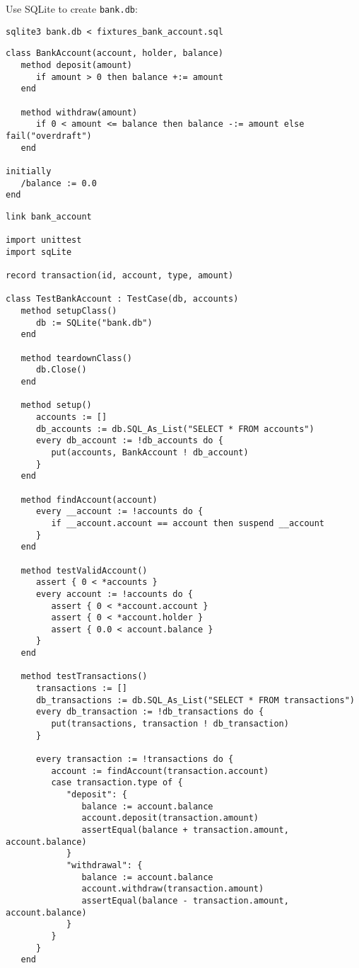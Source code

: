 \documentclass[letterpaper,12pt]{article}
\begin{document}
\noindent Use SQLite to create \texttt{bank.db}:
\begin{verbatim}
sqlite3 bank.db < fixtures_bank_account.sql
\end{verbatim}

\newpage\bigskip{}
\begin{verbatim}
class BankAccount(account, holder, balance)
   method deposit(amount)
      if amount > 0 then balance +:= amount
   end

   method withdraw(amount)
      if 0 < amount <= balance then balance -:= amount else fail("overdraft")
   end

initially
   /balance := 0.0
end
\end{verbatim}

\bigskip{}
\begin{verbatim}
link bank_account

import unittest
import sqLite

record transaction(id, account, type, amount)

class TestBankAccount : TestCase(db, accounts)
   method setupClass()
      db := SQLite("bank.db")
   end

   method teardownClass()
      db.Close()
   end

   method setup()
      accounts := []
      db_accounts := db.SQL_As_List("SELECT * FROM accounts")
      every db_account := !db_accounts do {
         put(accounts, BankAccount ! db_account)
      }
   end

   method findAccount(account)
      every __account := !accounts do {
         if __account.account == account then suspend __account
      }
   end

   method testValidAccount()
      assert { 0 < *accounts }
      every account := !accounts do {
         assert { 0 < *account.account }
         assert { 0 < *account.holder }
         assert { 0.0 < account.balance }
      }
   end

   method testTransactions()
      transactions := []
      db_transactions := db.SQL_As_List("SELECT * FROM transactions")
      every db_transaction := !db_transactions do {
         put(transactions, transaction ! db_transaction)
      }

      every transaction := !transactions do {
         account := findAccount(transaction.account)
         case transaction.type of {
            "deposit": {
               balance := account.balance
               account.deposit(transaction.amount)
               assertEqual(balance + transaction.amount, account.balance)
            }
            "withdrawal": {
               balance := account.balance
               account.withdraw(transaction.amount)
               assertEqual(balance - transaction.amount, account.balance)
            }
         }
      }
   end


\end{verbatim}
\end{document}
